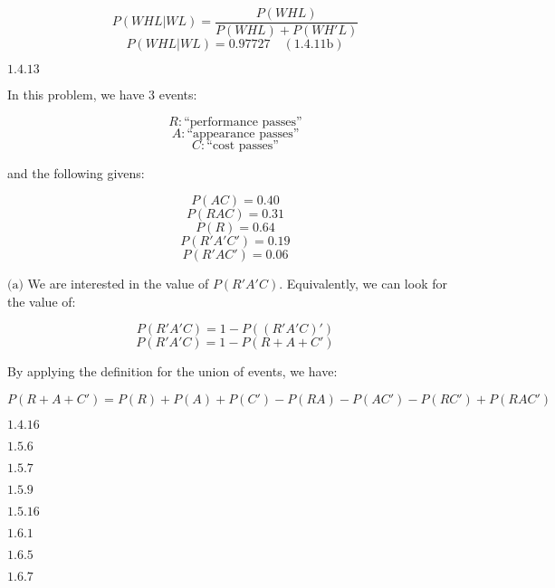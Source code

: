 \documentclass{article}
\newcommand{\problem}[2]{$\boxed{\text{#1.#2}}$}
\newcommand{\subproblem}[3]{$\boxed{\text{(#3)}}$}
\newcommand{\subsolution}[4]{\boxed{#4\quad(\text{#1.#2#3})}}
\begin{document}
\[
P(WHL|WL)=\dfrac{P(WHL)}{P(WHL)+P(WH'L)}
\] \[
\subsolution{1.4}{11}{b}{P(WHL|WL)=0.97727}
\]

%
\problem{1.4}{13}

In this problem, we have 3 events:

\[
R:\text{``performance passes''}
\] \[
A:\text{``appearance passes''}
\] \[
C:\text{``cost passes''}
\]

and the following givens:

\[
P(AC)=0.40
\] \[
P(RAC)=0.31
\] \[
P(R)=0.64
\] \[
P(R'A'C')=0.19
\] \[
P(R'AC')=0.06
\]

%
\subproblem{1.4}{13}{a} We are interested in the value of
$P(R'A'C)$. Equivalently, we can look for the value of:

\[
P(R'A'C)=1-P((R'A'C)')
\] \[
P(R'A'C)=1-P(R+A+C')
\]

By applying the definition for the union of events, we have:

\[
P(R+A+C')=P(R)+P(A)+P(C')-P(RA)-P(AC')-P(RC')+P(RAC')
\]

%
%
%
%
%
%
%
%
%
%
%
%
%


\problem{1.4}{16}




\problem{1.5}{6}




\problem{1.5}{7}




\problem{1.5}{9}




\problem{1.5}{16}




\problem{1.6}{1}




\problem{1.6}{5}




\problem{1.6}{7}
\end{document}

